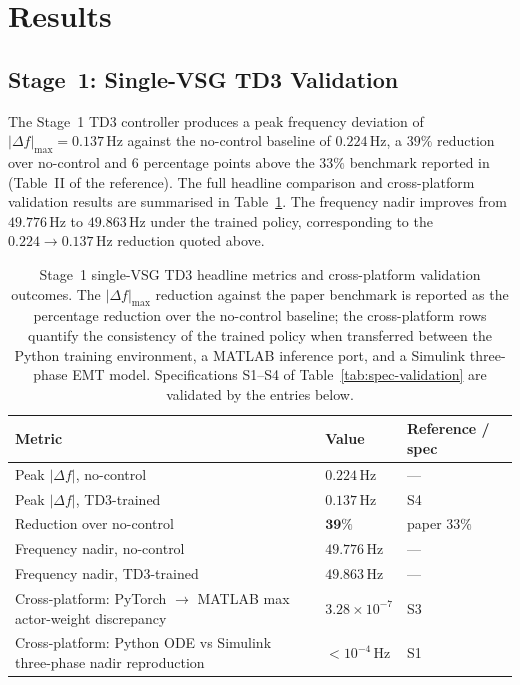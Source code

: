 \documentclass{unnc-fyp}
\begin{document}
\section{Results}

\subsection{Stage~1: Single-VSG TD3 Validation}
\label{sec:s1-results}

The Stage~1 TD3 controller produces a peak frequency deviation
of $|\Delta f|_{\max} = 0.137$\,Hz against the no-control
baseline of $0.224$\,Hz, a $39\%$ reduction over no-control and
$6$ percentage points above the $33\%$ benchmark reported
in~\cite{benhmidouch2024td3} (Table~II of the reference).
The full headline comparison and cross-platform validation
results are summarised in Table~\ref{tab:s1-headline}.
The frequency nadir improves from $49.776$\,Hz to $49.863$\,Hz
under the trained policy, corresponding to the $0.224 \to 0.137$\,Hz
reduction quoted above.

\begin{table}[tb]
  \centering
  \small
  \caption{Stage~1 single-VSG TD3 headline metrics and cross-platform
           validation outcomes. The $|\Delta f|_{\max}$ reduction
           against the paper benchmark is reported as the percentage
           reduction over the no-control baseline; the cross-platform
           rows quantify the consistency of the trained policy when
           transferred between the Python training environment, a
           MATLAB inference port, and a Simulink three-phase EMT
           model. Specifications S1--S4 of
           Table~\ref{tab:spec-validation} are validated by the
           entries below.}
  \label{tab:s1-headline}
  \begin{tabular}{@{}lll@{}}
    \toprule
    Metric & Value & Reference / spec \\
    \midrule
    Peak $|\Delta f|$, no-control     & $0.224$\,Hz             & --- \\
    Peak $|\Delta f|$, TD3-trained    & $0.137$\,Hz             & S4 \\
    Reduction over no-control         & $\mathbf{39\%}$         & paper $33\%$~\cite{benhmidouch2024td3} \\
    Frequency nadir, no-control       & $49.776$\,Hz            & --- \\
    Frequency nadir, TD3-trained      & $49.863$\,Hz            & --- \\
    \midrule
    Cross-platform: PyTorch $\to$ MATLAB
      max actor-weight discrepancy    & $3.28 \times 10^{-7}$   & S3 \\
    Cross-platform: Python ODE vs Simulink three-phase
      nadir reproduction              & $< 10^{-4}$\,Hz         & S1 \\
    \bottomrule
  \end{tabular}
\end{table}
\end{document}
